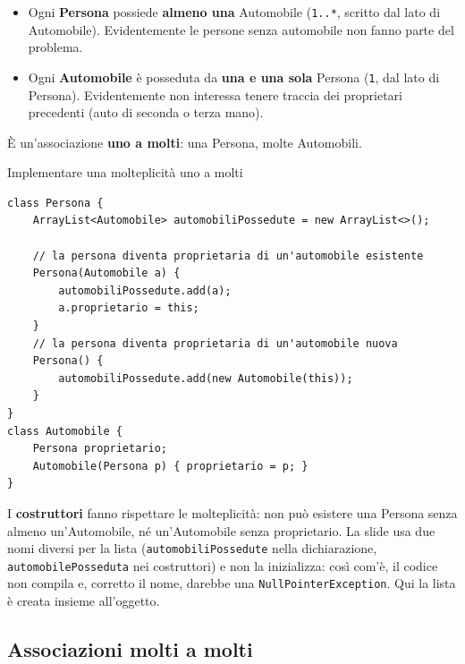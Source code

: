 \begin{itemize}
  \item Ogni \textbf{Persona} possiede \textbf{almeno una} Automobile (\texttt{1..*}, scritto dal lato di Automobile).
        Evidentemente le persone senza automobile non fanno parte del problema.
  \item Ogni \textbf{Automobile} è posseduta da \textbf{una e una sola} Persona (\texttt{1}, dal lato di Persona). Evidentemente
        non interessa tenere traccia dei proprietari precedenti (auto di seconda o terza mano).
\end{itemize}
È un'associazione \textbf{uno a molti}: una Persona, molte Automobili.


\begin{esempio}{Implementare una molteplicità uno a molti}
\begin{lstlisting}[style=java]
class Persona {
    ArrayList<Automobile> automobiliPossedute = new ArrayList<>();

    // la persona diventa proprietaria di un'automobile esistente
    Persona(Automobile a) {
        automobiliPossedute.add(a);
        a.proprietario = this;
    }
    // la persona diventa proprietaria di un'automobile nuova
    Persona() {
        automobiliPossedute.add(new Automobile(this));
    }
}
class Automobile {
    Persona proprietario;
    Automobile(Persona p) { proprietario = p; }
}
\end{lstlisting}
I \textbf{costruttori} fanno rispettare le molteplicità: non può esistere una Persona senza almeno un'Automobile, né
un'Automobile senza proprietario. La slide usa due nomi diversi per la lista (\texttt{automobiliPossedute} nella dichiarazione,
\texttt{automobilePosseduta} nei costruttori) e non la inizializza: così com'è, il codice non compila e, corretto il nome,
darebbe una \texttt{NullPointerException}. Qui la lista è creata insieme all'oggetto.
\end{esempio}

\subsection{Associazioni molti a molti}

